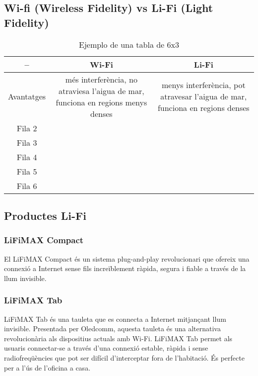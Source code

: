 \subsection*{Wi-fi (Wireless Fidelity) vs Li-Fi (Light Fidelity)}


\begin{table}[h]
\centering
\begin{tabular}{|c|c|c|}
\hline
-- & Wi-Fi & Li-Fi \\
\hline
Avantatges & més interferència, no atraviesa l'aigua de mar, funciona en regions menys denses & 
menys interferència, pot atravesar l'aigua de mar, funciona en regions denses \\
\hline
Fila 2 & & \\
\hline
Fila 3 & & \\
\hline
Fila 4 & & \\
\hline
Fila 5 & & \\
\hline
Fila 6 & & \\
\hline
\end{tabular}
\caption{Ejemplo de una tabla de 6x3}
\end{table}





\subsection*{Productes Li-Fi}

\subsubsection*{LiFiMAX Compact}

El LiFiMAX Compact és un sistema plug-and-play revolucionari que ofereix una connexió a Internet sense fils increïblement ràpida, segura i fiable a través de la llum invisible.

\subsubsection*{LiFiMAX Tab}

LiFiMAX Tab és una tauleta que es connecta a Internet mitjançant llum invisible. Presentada per Oledcomm, aquesta tauleta és una alternativa revolucionària als dispositius actuals amb Wi-Fi. LiFiMAX Tab permet als usuaris connectar-se a través d'una connexió estable, ràpida i sense radiofreqüències que pot ser difícil d'interceptar fora de l'habitació. És perfecte per a l'ús de l'oficina a casa.


